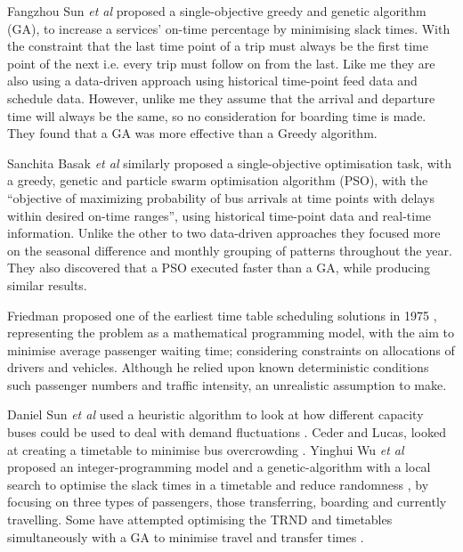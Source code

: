 \documentclass{article}
\begin{document}
\par
Fangzhou Sun \textsl{et al} proposed a single-objective greedy and genetic algorithm (GA)\cite{RN8}, to increase a services' on-time percentage by minimising slack times. With the constraint that the last time point of a trip must always be the first time point of the next i.e. every trip must follow on from the last. Like me they are also using a data-driven approach using historical time-point feed data and schedule data. However, unlike me they assume that the arrival and departure time will always be the same, so no consideration for boarding time is made. They found that a GA was more effective than a Greedy algorithm.  

\par
Sanchita Basak \textsl{et al} similarly proposed a single-objective optimisation task, with a greedy, genetic and particle swarm optimisation algorithm (PSO), with the ``objective of maximizing probability of bus arrivals at time points with delays within desired on-time ranges''\cite{RN7}, using  historical time-point data and real-time information. Unlike the other to two data-driven approaches they focused more on the seasonal difference and monthly grouping of patterns throughout the year. They also discovered that a PSO executed faster than a GA, while producing similar results.


\par 
Friedman proposed one of the earliest time table scheduling solutions in 1975\cite{RN22} , representing the problem as a mathematical programming model, with the aim to minimise average passenger waiting time; considering constraints on allocations of drivers and vehicles. Although he relied upon known deterministic conditions such passenger numbers and traffic intensity, an unrealistic assumption to make.

\par 
Daniel Sun \textsl{et al} used a heuristic algorithm to look at how different capacity buses could be used to deal with demand fluctuations  \cite{RN32}. Ceder and Lucas, looked at creating a timetable to minimise bus overcrowding \cite{RN33}. Yinghui Wu \textsl{et al} proposed an integer-programming model and a genetic-algorithm with a local search to optimise the slack times in a timetable and reduce randomness \cite{RN26}, by focusing on three types of passengers, those transferring, boarding and currently travelling. Some have attempted optimising the TRND and timetables simultaneously with a GA to minimise travel and transfer times \cite{RN23}\cite{RN31}. 
 
\end{document}
